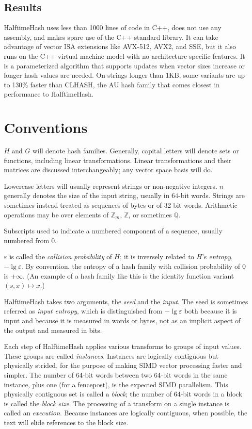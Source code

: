 \documentclass[sigconf, nonacm]{acmart}
\newcommand{\rats}{\mathbb{Q}}
\newcommand{\ints}{\mathbb{Z}}
\begin{document}
\subsection{Results}

HalftimeHash uses less than 1000 lines of code in C++, does not use any assembly, and makes spare use of the C++ standard library.
It can take advantage of vector ISA extensions like AVX-512, AVX2, and SSE, but it also runs on the C++ virtual machine model with no architecture-specific features.
It is a parameterized algorithm that supports updates when vector sizes increase or longer hash values are needed.
On strings longer than 1KB, some variants are up to 130\% faster than CLHASH, the AU hash family that comes closest in performance to HalftimeHash.

\section{Conventions}

$H$ and $G$ will denote hash families.
Generally, capital letters will denote sets or functions, including linear transformations.
Linear transformations and their matrices are discussed interchangeably; any vector space basis will do.

Lowercase letters will usually represent strings or non-negative integers.
$n$ generally denotes the size of the input string, usually in 64-bit words.
Strings are sometimes instead treated as sequences of bytes or of 32-bit words.
Arithmetic operations may be over elements of $\ints_m$, $\ints$, or sometimes $\rats$.

Subscripts used to indicate a numbered component of a sequence, usually numbered from 0.

$\varepsilon$ is called the {\em collision probability} of $H$; it is inversely related to $H$'s {\em entropy}, $-\lg \varepsilon$.
By convention, the entropy of a hash family with collision probability of $0$ is $+\infty$.
(An example of a hash family like this is the identity function variant $(s, x) \mapsto x$.)

HalftimeHash takes two arguments, the {\em seed} and the {\em input}.
The seed is sometimes referred as {\em input entropy}, which is distinguished from $-\lg \varepsilon$ both because it is input and because it is measured in words or bytes, not as an implicit aspect of the output and measured in bits.

Each step of HalftimeHash applies various transforms to groups of input values.
These groups are called {\em instances}.
Instances are logically contiguous but physically strided, for the purpose of making SIMD vector processing faster and simpler.
The number of 64-bit words between two 64-bit words in the same instance, plus one (for a fencepost), is the expected SIMD parallelism.
This physically contiguous set is called a {\em block}; the number of 64-bit words in a block is called the {\em block size}.
The processing of a transform on a single instance is called an {\em execution}.
Because instances are logically contiguous, when possible, the text will elide references to the block size.
\end{document}
